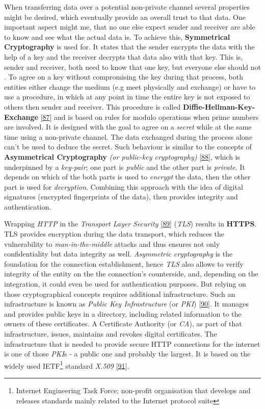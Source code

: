 \documentclass[12pt,english,a4paper,titlepage,cleardoublepage=empty,dottedtoc]{report}
\begin{document}
When transferring data over a potential non-private channel several
properties might be desired, which eventually provide an overall trust
to that data. One important aspect might me, that no one else expect
sender and receiver are able to know and see what the actual data is. To
achieve this, \textbf{Symmetrical Cryptography} is used for. It states
that the sender encrypts the data with the help of a key and the
receiver decrypts that data also with that key. This is, sender and
receiver, both need to know that one key, but everyone else should not .
To agree on a key without compromising the key during that process, both
entities either change the medium (e.g meet physically and exchange) or
have to use a procedure, in which at any point in time the entire key is
not exposed to others then sender and receiver. This procedure is called
\textbf{Diffie-Hellman-Key-Exchange}
{[}\protect\hyperlink{ref-paper_1976_d-h-key-exchange}{87}{]} and is
based on rules for modulo operations when prime numbers are involved. It
is designed with the goal to agree on a \emph{secret} while at the same
time using a non-private channel. The data exchanged during the process
alone can't be used to deduce the secret. Such behaviour is similar to
the concepts of
\textbf{\protect\hypertarget{link_asym-crypto}{}{Asymmetrical
Cryptography}} \emph{(or public-key cryptography)}
{[}\protect\hyperlink{ref-book_2014_chapter-9-1-public-key-crypto}{88}{]},
which is underpinned by a \emph{key-pair}; one part is \emph{public} and
the other part is \emph{private}. It depends on which of the both parts
is used to \emph{encrypt} the data, then the other part is used for
\emph{decryption}. Combining this approach with the idea of digital
signatures (encrypted fingerprints of the data), then provides integrity
and authentication.

Wrapping \emph{HTTP} in the \emph{Transport Layer Security}
{[}\protect\hyperlink{ref-web_spec_tls}{89}{]} (\emph{TLS}) results in
\textbf{HTTPS}. TLS provides encryption during the data transport, which
reduces the vulnerability to \emph{man-in-the-middle} attacks and thus
ensures not only confidentiality but data integrity as well.
\emph{Asymmetric cryptography} is the foundation for the connection
establishment, hence \emph{TLS} also allows to verify integrity of the
entity on the the connection's counterside, and, depending on the
integration, it could even be used for authentication purposes. But
relying on those cryptographical concepts requires additional
infrastructure. Such an infrastructure is known as \emph{Public Key
Infrastructure} (or \emph{PKI})
{[}\protect\hyperlink{ref-book_2014_chapter-14-5-pki}{90}{]}. It manages
and provides public keys in a directory, including related information
to the owners of these certificates. A Certificate Authority (or
\emph{CA}), as part of that infrastructure, issues, maintains and
revokes digital certificates. The infrastructure that is needed to
provide secure HTTP connections for the internet is one of those
\emph{PKI}s - a public one and probably the largest. It is based on the
widely used IETF\footnote{Internet Engineering Task Force; non-profit
  organisation that develops and releases standards mainly related to
  the Internet protocol suite} standard \emph{X.509}
{[}\protect\hyperlink{ref-web_spec_x509}{91}{]}.
\end{document}
